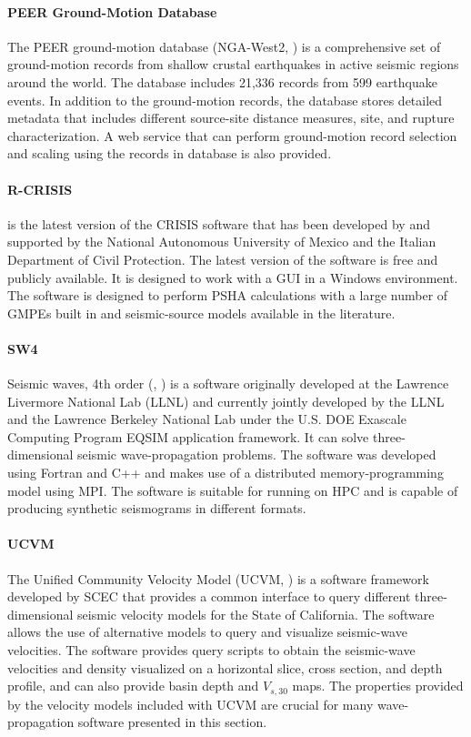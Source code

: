 \paragraph{PEER Ground-Motion Database} The PEER ground-motion database (NGA-West2, \cite{ancheta2014ngawest2}) is a comprehensive set of ground-motion records from shallow crustal earthquakes in active seismic regions around the world. The database includes 21,336 records from 599 earthquake events. In addition to the ground-motion records, the database stores detailed metadata that includes different source-site distance measures, site, and rupture characterization. A web service that can perform ground-motion record selection and scaling using the records in database is also provided.

\paragraph{R-CRISIS }  is the latest version of the CRISIS software that has been developed by \cite{ordaz2013crisis2008} and supported by the National Autonomous University of Mexico and the Italian Department of Civil Protection. The latest version of the software is free and publicly available. It is designed to work with a GUI in a Windows environment. The software is designed to perform PSHA calculations with a large number of GMPEs built in and seismic-source models available in the literature.

\paragraph{SW4} Seismic waves, 4th order (, \cite{petersson2017geodynamics}) is a software originally developed at the Lawrence Livermore National Lab (LLNL) and currently jointly developed by the LLNL and the Lawrence Berkeley National Lab under the U.S. DOE Exascale Computing Program EQSIM application framework. It can solve three-dimensional seismic wave-propagation problems. The software was developed using Fortran and C++ and makes use of a distributed memory-programming model using MPI. The software is suitable for running on HPC and is capable of producing synthetic seismograms in different formats.

\paragraph{UCVM} The Unified Community Velocity Model (UCVM, \cite{small2017scec}) is a software framework developed by SCEC that provides a common interface to query different three-dimensional seismic velocity models for the State of California. The software allows the use of alternative models to query and visualize seismic-wave velocities. The software provides query scripts to obtain the seismic-wave velocities and density visualized on a horizontal slice, cross section, and depth profile, and can also provide basin depth and $V_{s,30}$ maps. The properties provided by the velocity models included with UCVM are crucial for many wave-propagation software presented in this section.

